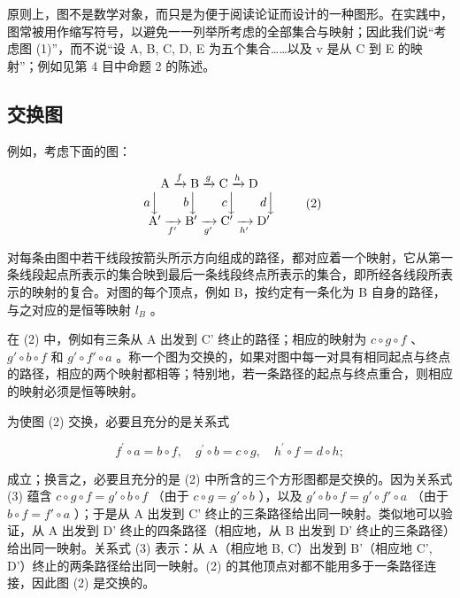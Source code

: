 原则上，图不是数学对象，而只是为便于阅读论证而设计的一种图形。在实践中，图常被用作缩写符号，以避免一一列举所考虑的全部集合与映射；因此我们说“考虑图 (1)”，而不说“设 A, B, C, D, E 为五个集合……以及 v 是从 C 到 E 的映射”；例如见第 4 目中命题 2 的陈述。

\subsection{交换图}

例如，考虑下面的图：

\[
\begin{array}{c} \mathrm{A} \xrightarrow {f} \mathrm{B} \xrightarrow {g} \mathrm{C} \xrightarrow {h} \mathrm{D} \\ a \Big \downarrow \qquad b \Big \downarrow \qquad c \Big \downarrow \qquad d \Big \downarrow \\ \mathrm{A} ^ {\prime} \xrightarrow [ f ^ {\prime} ]{} \mathrm{B} ^ {\prime} \xrightarrow [ g ^ {\prime} ]{} \mathrm{C} ^ {\prime} \xrightarrow [ h ^ {\prime} ]{} \mathrm{D} ^ {\prime} \end{array}\tag{2}
\]

对每条由图中若干线段按箭头所示方向组成的路径，都对应着一个映射，它从第一条线段起点所表示的集合映到最后一条线段终点所表示的集合，即所经各线段所表示的映射的复合。对图的每个顶点，例如 B，按约定有一条化为 B 自身的路径，与之对应的是恒等映射 \(l_{B}\) 。

在 (2) 中，例如有三条从 A 出发到 C' 终止的路径；相应的映射为 \(c \circ g \circ f\) 、 \(g' \circ b \circ f\) 和 \(g' \circ f' \circ a\) 。称一个图为交换的，如果对图中每一对具有相同起点与终点的路径，相应的两个映射都相等；特别地，若一条路径的起点与终点重合，则相应的映射必须是恒等映射。

为使图 (2) 交换，必要且充分的是关系式

\[
f ^ {\prime} \circ a = b \circ f, \quad g ^ {\prime} \circ b = c \circ g, \quad h ^ {\prime} \circ f = d \circ h;\tag{3}
\]

成立；换言之，必要且充分的是 (2) 中所含的三个方形图都是交换的。因为关系式 (3) 蕴含 \(c \circ g \circ f = g' \circ b \circ f\) （由于 \(c \circ g = g' \circ b\) ），以及 \(g' \circ b \circ f = g' \circ f' \circ a\) （由于 \(b \circ f = f' \circ a\) ）；于是从 A 出发到 C' 终止的三条路径给出同一映射。类似地可以验证，从 A 出发到 D' 终止的四条路径（相应地，从 B 出发到 D' 终止的三条路径）给出同一映射。关系式 (3) 表示：从 A（相应地 B, C）出发到 B'（相应地 C', D'）终止的两条路径给出同一映射。(2) 的其他顶点对都不能用多于一条路径连接，因此图 (2) 是交换的。

